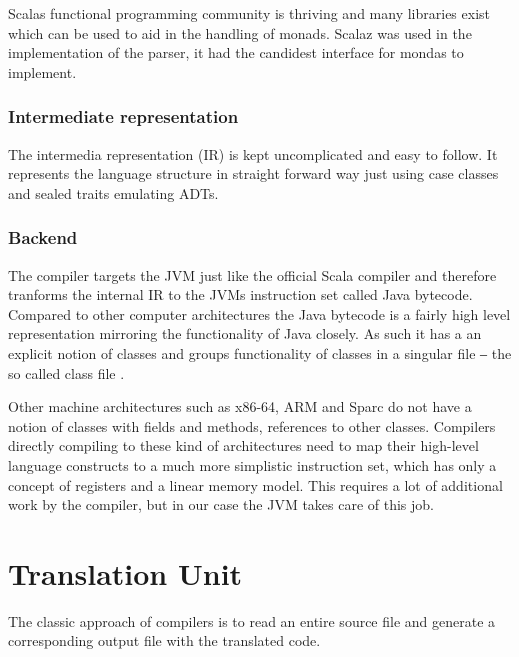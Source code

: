 \documentclass{VUMIFPSbakalaurinis}
\begin{document}
Scalas functional programming community is thriving and many libraries exist which can be used to aid in the handling of monads.
Scalaz \cite{scalaz} was used in the implementation of the parser, it had the candidest interface for mondas to implement.


\subsubsection{Intermediate representation}

The intermedia representation (IR) is kept uncomplicated and easy to follow.
It represents the language structure in straight forward way just using case classes and sealed traits emulating ADTs.



\subsubsection{Backend}

The compiler targets the JVM just like the official Scala compiler and therefore tranforms the internal IR to the JVMs instruction set called Java bytecode.
Compared to other computer architectures the Java bytecode is a fairly high level representation mirroring the functionality of Java closely.
As such it has a an explicit notion of classes and groups functionality of classes in a singular file ‒ the so called class file \cite{ClassFileFormat}.

Other machine architectures such as x86-64, ARM and Sparc do not have a notion of classes with fields and methods, references to other classes.
Compilers directly compiling to these kind of architectures need to map their high-level language constructs to a much more simplistic instruction set, which has only a concept of registers and a linear memory model.
This requires a lot of additional work by the compiler, but in our case the JVM takes care of this job.

\section{Translation Unit}
The classic approach of compilers is to read an entire source file and generate a corresponding output file with the translated code.
\end{document}
